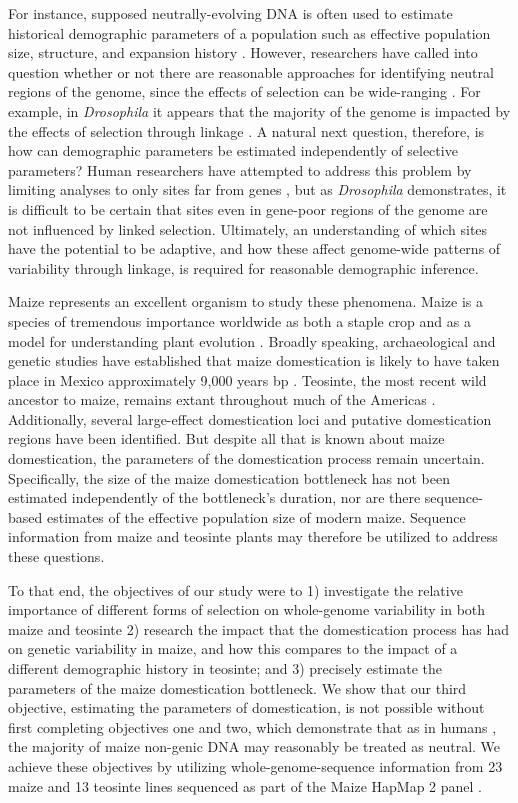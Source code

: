 \documentclass{pnastwo}
\begin{document}
\begin{article}
For instance, supposed neutrally-evolving DNA is often used to estimate historical demographic
parameters of a population such as effective population size, structure, and expansion
history \cite{luikart2003, gutenkunst2009}. However, researchers have
called into question whether or not there are reasonable approaches
for identifying neutral regions of the genome, since the effects of
selection can be wide-ranging \cite{li2012, slotte2014}. For example, in
\emph{Drosophila} it appears that the majority of the genome is
impacted by the effects of selection through linkage
\cite{sella2009}. A natural next question, therefore, is how can
demographic parameters be estimated independently of
selective parameters? Human researchers have attempted to address this
problem by limiting analyses to only sites far from genes
\cite{gazave2014}, but as \emph{Drosophila} demonstrates, it is
difficult to be certain that sites even in gene-poor regions of the
genome are not influenced by linked selection. Ultimately, an understanding
of which sites have the potential to be adaptive, and how these affect
genome-wide patterns of variability through linkage, is required for
reasonable demographic inference.

Maize represents an excellent organism to study these
phenomena. Maize is a species of tremendous importance worldwide as
both a staple crop \cite{shiferaw2011} and as a model for
understanding plant evolution \cite{strable2009}. Broadly speaking, archaeological and genetic studies have
established that maize domestication is likely to have taken place in
 Mexico approximately 9,000 years bp
\cite{smith1995,matsuoka2002}. Teosinte, the most
recent wild ancestor to maize, remains extant throughout much of the
Americas \cite{wilkes1967}. Additionally, several large-effect
domestication loci \cite{doebley1995, wills2013, wang2015} and putative domestication
regions \cite{hufford2012} have been identified. But despite all that is
known about maize domestication, the parameters of the
domestication process remain uncertain. Specifically, the size of the
maize domestication bottleneck has not been estimated independently of
the bottleneck's duration, nor are there sequence-based estimates of the effective
population size of modern maize. Sequence information from maize and
teosinte plants may therefore be utilized to address these questions.

To that end, the objectives of our study were to 1) investigate the
relative importance of different forms of selection on whole-genome
variability in both maize and teosinte 2) research the impact that the
domestication process has had on genetic variability in maize, and how
this compares to the impact of a different demographic history in
teosinte; and 3) precisely estimate the parameters of the
maize domestication bottleneck. We show that our third objective, estimating the
parameters of domestication, is not possible without first completing
 objectives one and two, which demonstrate that as in humans \cite{gazave2014}, the
majority of maize non-genic DNA may reasonably be treated as
neutral. We achieve these objectives by utilizing
whole-genome-sequence information from 23 maize and 13 teosinte lines
sequenced as part of the Maize HapMap 2 panel \cite{chia2012}.


\end{article}
\end{document}
